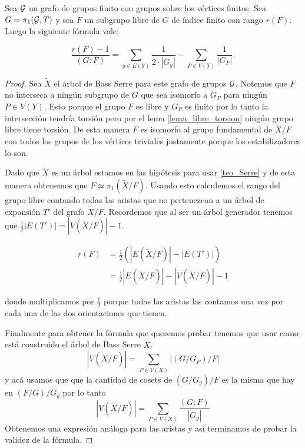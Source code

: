\documentclass[tesis.tex]{subfiles}
\newcommand{\cG}{ {\cal G} }
\newcommand{\Xm}{\widetilde X}
\begin{document}
\begin{prop}\cite{karrass1973finite}\label{prop_karrass_formula}
	Sea $\cal G$ un grafo de grupos finito con grupos sobre los vértices finitos.
	Sea $G = \pi_1 ({\cal G}, T)$ y sea $F$ un subgrupo libre de $G$ de índice finito con rango $r(F)$.
	Luego la siguiente fórmula vale:
	
	\begin{equation*}
		\frac{r(F) - 1}{(G:F)} = \sum_{y \in E(Y)} \frac{1}{2 \cdot |G_y|} - \sum_{P \in V(Y)} \frac{1}{|G_P|}.
	\end{equation*}
\end{prop}
\begin{proof}
	Sea $\tilde X$ el árbol de Bass Serre para este grafo de grupos $\cG$.
	Notemos que $F$ no interseca a ningún subgrupo de $G$ que sea isomorfo a $G_P$ para ningún $P \in V(Y)$. 
	Esto porque el grupo $F$ es libre y $G_P$ es finito por lo tanto la intersección tendría torsión pero por el lema \ref{lema_libre_torsion} ningún grupo libre tiene torsión.
	De esta manera $F$ es isomorfo al grupo fundamental de $\Xm / F$ con todos los grupos de los vértices triviales justamente porque los estabilizadores lo son.
	
	Dado que $\tilde X$ es un árbol estamos en las hipótesis para usar \ref{teo_Serre} y de esta manera obtenemos que $F \simeq \pi_1 (\widetilde X / F)$.
	Usando esto calculemos el rango del grupo libre contando todas las aristas que no pertenezcan a un árbol de expansión $T'$ del grafo $\Xm / F$.
	Recordemos que al ser un árbol generador tenemos que $\tfrac{1}{2}|E(T')| = |V(\Xm / F)| - 1$. 
	
	\begin{align*}
		r(F) &= \frac{1}{2} (|E(\Xm / F)| - |E(T')|) \\
		&= \frac{1}{2} |E(\Xm / F)| - |V(\Xm / F) | - 1
	\end{align*}

	donde multiplicamos por $\tfrac{1}{2}$ porque todas las aristas las contamos una vez por cada una de las dos orientaciones que tienen.
	
	Finalmente para obtener la fórmula que queremos probar tenemos que usar como está construido el árbol de Bass Serre $\Xm$.
	\begin{equation*}
		|V(\Xm / F)| = \sum_{P \in V(X)} |(G/G_P)/F|
	\end{equation*}
	y acá usamos que que la cantidad de cosets de $(G/G_y)/F$ es la misma que hay en $(F / G)/G_y$
	por lo tanto 
	\begin{equation*}
		|V(\Xm / F)| = \sum_{P \in V(X)} \dfrac{(G:F)}{|G_y|}
	\end{equation*}
	Obtenemos una expresión análoga para las aristas y así terminamos de probar la validez de la fórmula.
\end{proof}
\end{document}
